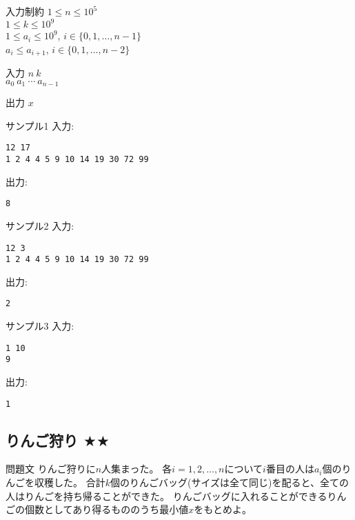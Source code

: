 \documentclass[a4paper,twoside,onecolumn,openany,article,10pt]{memoir}
\theoremstyle{remark}
\begin{document}
\begin{itembox}[l]{入力制約}
$1\le n\le 10^5$\\
$1\le k\le 10^9$\\
$1\le a_i\le 10^9$,\hspace{2em} $i\in\{0,1,\dotsc,n-1\}$\\
$a_i\le a_{i+1}$,\hspace{2em} $i\in\{0,1,\dotsc,n-2\}$
\end{itembox}

\begin{itembox}[l]{入力}
$n~k$\\
$a_0~a_1~\dotsb~a_{n-1}$
\end{itembox}

\begin{itembox}[l]{出力}
$x$
\end{itembox}

\begin{itembox}[l]{サンプル1}
入力:
\begin{verbatim}
12 17
1 2 4 4 5 9 10 14 19 30 72 99
\end{verbatim}
出力:
\begin{verbatim}
8
\end{verbatim}
\end{itembox}

\begin{itembox}[l]{サンプル2}
入力:
\begin{verbatim}
12 3
1 2 4 4 5 9 10 14 19 30 72 99
\end{verbatim}
出力:
\begin{verbatim}
2
\end{verbatim}
\end{itembox}

\begin{itembox}[l]{サンプル3}
入力:
\begin{verbatim}
1 10
9
\end{verbatim}
出力:
\begin{verbatim}
1
\end{verbatim}
\end{itembox}

\clearpage
\subsection{りんご狩り $\bigstar\bigstar$}
\begin{itembox}[l]{問題文}
りんご狩りに$n$人集まった。
各$i=1,2,\dotsc,n$について$i$番目の人は$a_i$個のりんごを収穫した。
合計$k$個のりんごバッグ(サイズは全て同じ)を配ると、全ての人はりんごを持ち帰ることができた。
りんごバッグに入れることができるりんごの個数としてあり得るもののうち最小値$x$をもとめよ。
\end{itembox}
\end{document}
